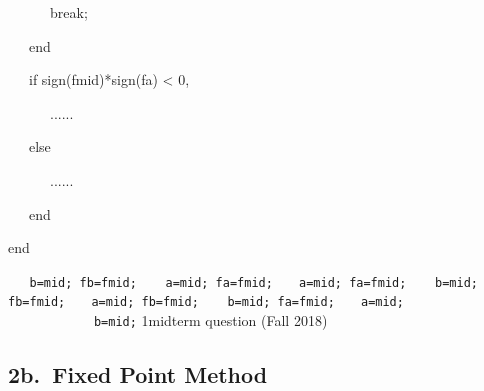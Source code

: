 \documentclass[10pt]{article}
\newcounter{totalQ}\setcounter{totalQ}{1}
\newcommand{\mysecnum}{0}
\newcommand{\mysubhead}[2]{%
  \subsection*{{\sffamily\bfseries #1.~#2}}\renewcommand{\mysecnum}{#1}}
\newenvironment{clicklist}{%
  \begin{enumerate}
    \renewcommand{\labelenumi}{{\sffamily\bfseries Q{\mysecnum}--\arabic{enumi}.}}
    \renewcommand{\labelenumi}{{\sffamily\bfseries Q{\mysecnum}--\arabic{enumi}${}^\text{\arabic{totalQ}}$.}}
    \setlength{\itemindent}{\widthof{Q}+\labelsep}
  }{%
  \end{enumerate}}
\begin{document}
\begin{clicklist}
{{{        ~~~~~~break;

        ~~~end

        ~~~if sign(fmid)*sign(fa) < 0,

        ~~~~~~......

        ~~~else

        ~~~~~~......

        ~~~end

        end}
    }}%
  {{\tt ~~~b=mid; fb=fmid; ~~~a=mid; fa=fmid;}}%
  {{\tt ~~~a=mid; fa=fmid; ~~~b=mid; fb=fmid;}}%
  {{\tt ~~~a=mid; fb=fmid; ~~~b=mid; fa=fmid;}}%
  {{\tt ~~~a=mid; ~~~~~~~~~~~~b=mid;}}%
  {1}{}{\courseID midterm question (Fall 2018)} 
  
\end{clicklist} 

\mysubhead{2b}{Fixed Point Method}
\end{document}
